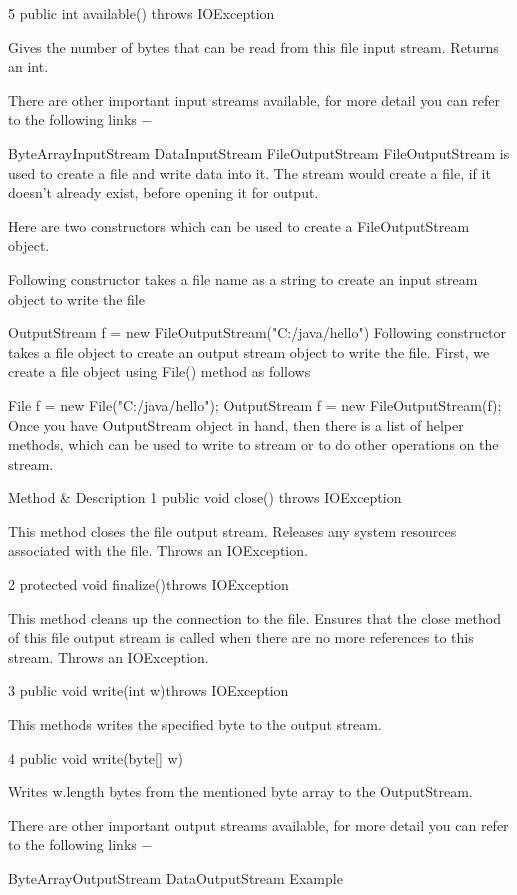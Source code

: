 5
 public int available() throws IOException{}

Gives the number of bytes that can be read from this file input stream. Returns an int.

There are other important input streams available, for more detail you can refer to the following links −

ByteArrayInputStream
DataInputStream
FileOutputStream
FileOutputStream is used to create a file and write data into it. The stream would create a file, if it doesn't already exist, before opening it for output.

Here are two constructors which can be used to create a FileOutputStream object.

Following constructor takes a file name as a string to create an input stream object to write the file

OutputStream f = new FileOutputStream("C:/java/hello")
Following constructor takes a file object to create an output stream object to write the file. First, we create a file object using File() method as follows

File f = new File("C:/java/hello");
OutputStream f = new FileOutputStream(f);
Once you have OutputStream object in hand, then there is a list of helper methods, which can be used to write to stream or to do other operations on the stream.

 	Method & Description
1
public void close() throws IOException{}

This method closes the file output stream. Releases any system resources associated with the file. Throws an IOException.

2
protected void finalize()throws IOException {}

This method cleans up the connection to the file. Ensures that the close method of this file output stream is called when there are no more references to this stream. Throws an IOException.

3
 public void write(int w)throws IOException{}

This methods writes the specified byte to the output stream.

4
 public void write(byte[] w)

Writes w.length bytes from the mentioned byte array to the OutputStream.

There are other important output streams available, for more detail you can refer to the following links −

ByteArrayOutputStream
DataOutputStream
Example

